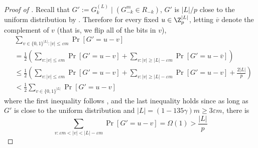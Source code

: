 \documentclass{toc}
\newcommand{\cond}{\;|\;}
\newcommand{\zo}{\ensuremath{ \{ 0, 1 \} }}
\newcommand{\gap}{\ensuremath{\varepsilon}}
\newcommand{\bigomega}[1]{\ensuremath{{\Omega \left( {#1} \right)}}}
\newcommand{\eqdef}{\ensuremath{:=}}
\begin{document}
	\begin{proof}[Proof of ]
		Recall that $G'\eqdef  G_k^{(L)}\cond (G_{-k}^m \in R_{-k})$,
		$G'$ is $|L|/p$ close to the uniform distribution by . 
		Therefore for every fixed $u\in \Z_p^{|L|}$, letting $\overline{v}$ denote the complement of $v$ {\color{black}(that is, we flip all of the bits in $v$)},
		\begin{align*}
			& \sum_{v\in\zo^{|L|}: |v|\le \gap m} \Pr\left[ G'=u-v \right]\\  
			&= \frac{1}{2}\left(\sum_{v:|v|\le \gap m}\Pr\left[G'=u-v\right]+\sum_{v:|v|\ge |L|-\gap m}\Pr\left[G'=u-\overline{v}\right]\right)\\
	 		&\le  \frac{1}{2}\left(\sum_{v:|v|\le \gap m}\Pr\left[G'=u-v\right]+\sum_{v:|v|\ge |L|-\gap m}\Pr\left[G'={u-v} \right]+\frac{2|L|}{p}\right)\\
	 		&<  \frac{1}{2}\sum_{v\in \zo^{|L|}}\Pr\left[G'={u-v} \right]
		\end{align*}
		where the first inequality follows ,
		and the last inequality holds since as long as $G'$ is close to the uniform distribution and $|L|=(1-135\gamma)m\ge 3\gap m$, there is 
		\[\sum_{v:\gap m<|v|<|L|-\gap m}\Pr\left[G'={u-v} \right] = \bigomega{1}> \frac{|L|}{p}\]


\end{proof}
\end{document}
